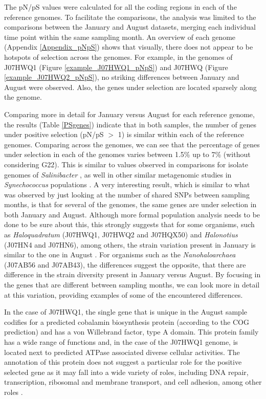The pN/pS values were calculated for all the coding regions in each of the reference genomes. To facilitate the comparisons, the analysis was limited to the comparisons between the January and August datasets, merging each individual time point within the same sampling month. An overview of each genome (Appendix \ref{Appendix_pNpS}) shows that visually, there does not appear to be hotspots of selection across the genomes. For example, in the genomes of J07HWQ1 (Figure \ref{example_J07HWQ1_pNpS}) and J07HWQ (Figure \ref{example_J07HWQ2_pNpS}), no striking differences between January and August were observed. Also, the genes under selection are located sparsely along the genome.

Comparing more in detail for January versus August for each reference genome, the results (Table \ref{PSgenes}) indicate that in both samples, the number of genes under positive selection (pN/pS $>$ 1) is similar within each of the reference genomes. Comparing across the genomes, we can see that the percentage of genes under selection in each of the genomes varies between 1.5\% up to 7\% (without considering G22). This is similar to values observed in comparisons for isolate genomes of \textit{Salinibacter} \cite{PeNtildeA:2010ie}, as well in other similar metagenomic studies in \textit{Synechococcus} populations \cite{Tai:2011jo}. A very interesting result, which is similar to what was observed by just looking at the number of shared SNPs between sampling months, is that for several of the genomes, the same genes are under selection in both January and August. Although more formal population analysis needs to be done to be sure about this, this strongly suggests that for some organisms, such as \textit{Haloquadratum} (J07HWQ1, J07HWQ2 and J07HQX50) and \textit{Halonotius} (J07HN4 and J07HN6), among others, the strain variation present in January is similar to the one in August \cite{Vos:2011ux}. For organisms such as the \textit{Nanohaloarchaea} (J07AB56 and J07AB43), the differences suggest the opposite, that there are difference in the strain diversity present in January versus August. By focusing in the genes that are different between sampling months, we can look more in detail at this variation, providing examples of some of the encountered differences.

In the case of J07HWQ1, the single gene that is unique in the August sample codifies for a predicted cobalamin biosynthesis protein (according to the COG prediction) and has a von Willebrand factor, type A domain. This protein family has a wide range of functions and, in the case of the J07HWQ1 genome, is located next to predicted ATPase associated diverse cellular activities. The annotation of this protein does not suggest a particular role for the positive selected gene as it may fall into a wide variety of roles, including DNA repair, transcription, ribosomal and membrane transport, and cell adhesion, among other roles \cite{Whittaker:2002ug,Makarova:2010bi}.

